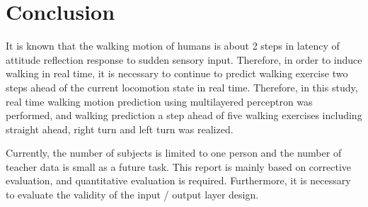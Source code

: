 \documentclass{sigchi}
\begin{document}
%
%
\section{Conclusion}%
It is known that the walking motion of humans is about 2 steps in latency of attitude reflection response to sudden sensory input. Therefore, in order to induce walking in real time, it is necessary to continue to predict walking exercise two steps ahead of the current locomotion state in real time. Therefore, in this study, real time walking motion prediction using multilayered perceptron was performed, and walking prediction a step ahead of five walking exercises including straight ahead, right turn and left turn was realized.

Currently, the number of subjects is limited to one person and the number of teacher data is small as a future task. This report is mainly based on corrective evaluation, and quantitative evaluation is required. Furthermore, it is necessary to evaluate the validity of the input / output layer design.
\end{document}
